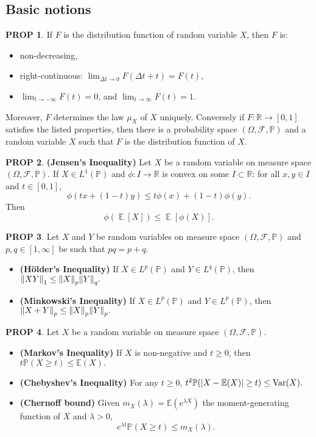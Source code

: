 \documentclass[hidelinks,11pt]{article}
\theoremstyle{definition}
\theoremstyle{dotless}
\newtheorem{prop}{PROP}[section]
\theoremstyle{remark}
\DeclareMathOperator{\Var}{Var}
\DeclareMathOperator{\E}{\mathbb{E}}
\DeclareMathOperator{\1}{\mathbf{1}}
\begin{document}
\subsection{Basic notions}

\begin{prop}\label{Prop 2.1}
If $F$ is the distribution function of random variable $X$, then $F$ is:\begin{itemize}
    \item non-decreasing,
    \item right-continuous: $\lim_{\Delta t\to0}F(\Delta t+t)=F(t)$,
    \item $\lim_{t\to-\infty}F(t)=0$, and $\lim_{t\to\infty}F(t)=1$.
\end{itemize}
Moreover, $F$ determines the law $\mu_X$ of $X$ uniquely. Conversely if $F:\mathbb{R}\to[0,1]$ satisfies the listed properties, then there is a probability space $(\Omega, \mathcal{F},\mathbb{P})$ and a random variable $X$ such that $F$ is the distribution function of $X$.
\end{prop}

\begin{prop}\textup{\textbf{(Jensen's Inequality) }}Let $X$ be a random variable on measure space $(\Omega,\mathcal{F},\mathbb{P})$. If $X\in L^1(\mathbb{P})$ and $\phi:I\to\mathbb{R}$ is convex on some $I\subset\mathbb{R}$: for all $x,y\in I$ and $t\in[0,1]$,
\[\phi(tx+(1-t)y)\leq t\phi(x)+(1-t)\phi(y).\]
Then
\[\phi(\E[X])\leq\E[\phi(X)].\]
\end{prop}

\begin{prop}
Let $X$ and $Y$ be random variables on measure space $(\Omega,\mathcal{F},\mathbb{P})$ and $p,q\in[1,\infty]$ be such that $pq=p+q$.
\begin{itemize}
    \item \textup{\textbf{(Hölder's Inequality)}} If $X\in L^p(\mathbb{P})$ and $Y\in L^q(\mathbb{P})$, then $\norm{XY}_1\leq\norm{X}_p\norm{Y}_q.$
    \item \textup{\textbf{(Minkowski's Inequality)}} If $X\in L^p(\mathbb{P})$ and $Y\in L^p(\mathbb{P})$, then $\norm{X+Y}_{p}\leq\norm{X}_p\norm{Y}_p.$
\end{itemize}
\end{prop}

\begin{prop}
Let $X$ be a random variable on measure space $(\Omega,\mathcal{F},\mathbb{P})$.
\begin{itemize}
    \item \textup{\textbf{(Markov's Inequality)}} If $X$ is non-negative and $t\geq0$, then $t\mathbb{P}(X\geq t)\leq\mathbb{E}(X).$
    \item \textup{\textbf{(Chebyshev's Inequality)}} For any $t\geq0$, $t^2\mathbb{P}(\abs{X-\mathbb{E}(X)}\geq t)\leq\Var(X).$
    \item \textup{\textbf{(Chernoff bound)}} Given $m_X(\lambda)=\mathbb{E}(e^{\lambda X})$ the moment-generating function of $X$ and $\lambda>0$,
    \[e^{\lambda t}\mathbb{P}(X\geq t)\leq m_X(\lambda).\]
\end{itemize}
\end{prop}
\end{document}
